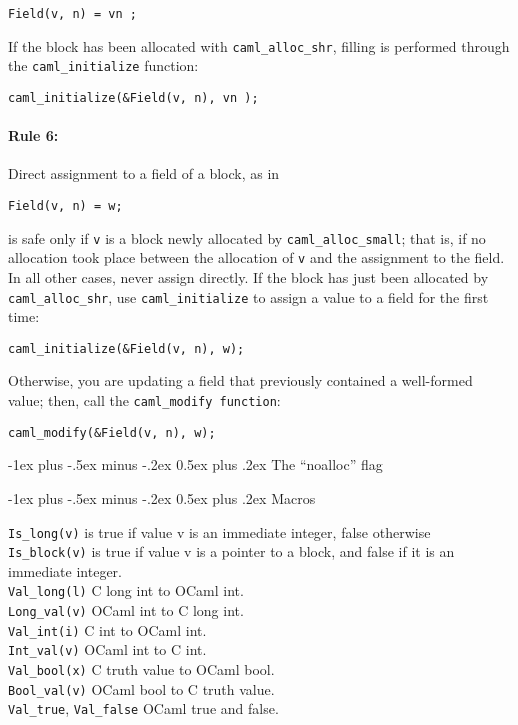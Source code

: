 \documentclass[10pt,landscape]{article}
\makeatletter
\renewcommand{\section}{\@startsection{section}{1}{0mm}%
        {-1ex plus -.5ex minus -.2ex}%
        {0.5ex plus .2ex}%
        {\normalfont\large\bfseries}}
\makeatother
\begin{document}
\begin{multicols}{3}
\verb!Field(v, n) = vn ;!

If the block has been allocated with \verb!caml_alloc_shr!, filling is
performed through the \verb!caml_initialize! function:

\verb!caml_initialize(&Field(v, n), vn );!

\paragraph{Rule 6:}
Direct assignment to a field of a block, as in

\verb!Field(v, n) = w;!

is safe only if \verb!v! is a block newly allocated by
\verb!caml_alloc_small!; that is, if no allocation took place between
the allocation of \verb!v! and the assignment to the field. In all
other cases, never assign directly.  If the block has just been
allocated by \verb!caml_alloc_shr!, use
\verb!caml_initialize! to
assign a value to a field for the first time:

\verb!caml_initialize(&Field(v, n), w);!

Otherwise, you are updating a field that previously contained a
well-formed value; then, call the \verb!caml_modify function!:

\verb!caml_modify(&Field(v, n), w);!

\section{The ``noalloc'' flag}

\section{Macros}

\verb!Is_long(v)! is true if value v is an immediate integer, false otherwise\\
\verb!Is_block(v)! is true if value v is a pointer to a block, and false if it is an immediate integer.\\

\verb!Val_long(l)! C long int to OCaml int.\\
\verb!Long_val(v)! OCaml int to C long int.\\
\verb!Val_int(i)! C int to OCaml int.\\
\verb!Int_val(v)! OCaml int to C int.\\
\verb!Val_bool(x)! C truth value to OCaml bool.\\
\verb!Bool_val(v)! OCaml bool to C truth value.\\
\verb!Val_true!, \verb!Val_false! OCaml true and false.\\


\end{multicols}
\end{document}
